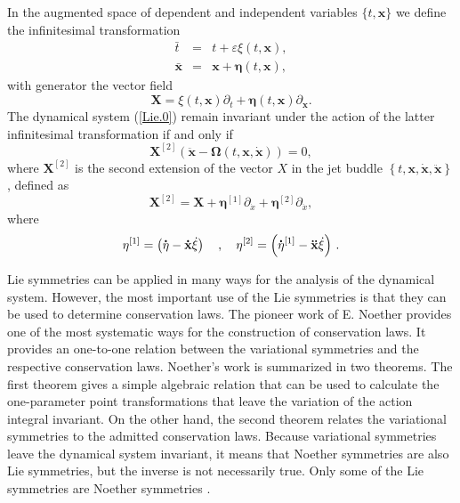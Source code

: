 \documentclass[onecolumn,superscriptaddress,secnumarabic,nobibnotes,aps,prd,nofootinbib,altaffilletter,11pt]{revtex4}
\begin{document}
In the augmented space of dependent and independent variables $\{t,\mathbf{x}%
\}$ we define the infinitesimal transformation 
\begin{eqnarray}
\bar{t} &=&t+\varepsilon \xi \left( t,\mathbf{x}\right) , \\
\mathbf{\bar{x}} &=&\mathbf{x}+\mathbf{\eta }\left( t,\mathbf{x}\right) ,
\end{eqnarray}%
with generator the vector field 
\begin{equation}
\mathbf{X}=\xi \left( t,\mathbf{x}\right) \partial _{t}+\mathbf{\eta }\left(
t,\mathbf{x}\right) \partial _{\mathbf{x}}.
\end{equation}
The dynamical system (\ref{Lie.0}) remain invariant under the action of the
latter infinitesimal transformation if and only if \cite{noe2} 
\begin{equation}
\mathbf{X}^{\left[ 2\right] }\left( \mathbf{\ddot{x}}-\mathbf{\Omega }\left(
t,\mathbf{x},\mathbf{\dot{x}}\right) \right) =0,
\end{equation}%
where $\mathbf{X}^{\left[ 2\right] }$ is the second extension of the vector $%
X$ in the jet buddle $\left\{ t,\mathbf{x},\mathbf{\dot{x}},\mathbf{\ddot{x}}%
\right\} $, defined as%
\begin{equation}
\mathbf{X}^{\left[ 2\right] }=\mathbf{X}+\mathbf{\eta }^{\left[ 1\right]
}\partial _{\dot{x}}+\mathbf{\eta }^{\left[ 2\right] }\partial _{\ddot{x}},
\end{equation}%
where
\begin{equation}
\mathbf{\eta }^{\left[ 1\right] } = \left( \mathbf{\dot{\eta}}-\mathbf{\dot{%
x}}\dot{\xi}\right) \quad , \quad \mathbf{\eta }^{\left[ 2\right] } = \left( \mathbf{\dot{\eta}}^{\left[ 1 \right] }-\mathbf{\ddot{x}}\dot{\xi}\right) \,.
\end{equation}

Lie symmetries can be applied in many ways for the analysis of the dynamical
system. However, the most important use of the Lie symmetries is that they
can be used to determine conservation laws. The pioneer work of E. Noether \cite{noe0} provides one of the most
systematic ways for the construction of conservation laws. It provides an one-to-one relation between the variational symmetries and the respective conservation laws. Noether's work is summarized in two theorems. The first
theorem gives a simple algebraic relation that can be used to calculate the one-parameter point transformations that leave the variation of the action integral invariant. On the other hand, the second theorem relates the variational symmetries to the admitted conservation laws. Because variational symmetries leave the dynamical system invariant, it means that
Noether symmetries are also Lie symmetries, but the inverse is not necessarily true. Only some of the Lie symmetries are Noether symmetries \cite{noe1}.
\end{document}
